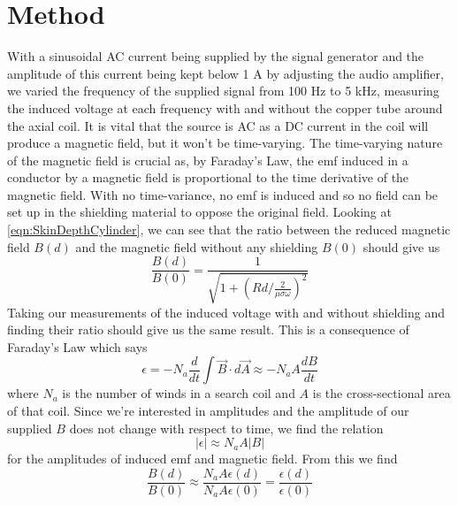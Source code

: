 \documentclass[12pt]{article}
\numberwithin{equation}{section}
\numberwithin{figure}{section}
\begin{document}
    \section{Method}\label{sec:Method}
    With a sinusoidal AC current being supplied by the signal generator and the amplitude of this 
    current being kept below 1 A by adjusting the audio amplifier, we varied the frequency 
    of the supplied signal from 100 Hz to 5 kHz, measuring the induced voltage at each frequency 
    with and without the copper tube around the axial coil. It is vital that the source is AC 
    as a DC current in the coil will produce a magnetic field, but it won't be time-varying. The 
    time-varying nature of the magnetic field is crucial as, by Faraday's Law, the emf induced 
    in a conductor by a magnetic field is proportional to the time derivative of the magnetic 
    field. With no time-variance, no emf is induced and so no field can be set up in the shielding 
    material to oppose the original field. Looking at \autoref{eqn:SkinDepthCylinder}, 
    we can see that the ratio between the reduced magnetic field $B(d)$ and the magnetic field 
    without any shielding $B(0)$ should give us
    \begin{equation}
        \frac{B(d)}{B(0)}=\frac{1}{\sqrt{1+(Rd/\frac{2}{\mu\sigma\omega})^2}}
        \label{eqn:TheoreticalModel}
    \end{equation}
    Taking our measurements of the induced voltage with and without shielding and finding their 
    ratio should give us the same result. This is a consequence of Faraday's Law which says 
    \begin{equation}
        \epsilon = -N_a \frac{d}{dt}\int \vec{B}\cdot d\vec{A}\approx-N_a A \frac{dB}{dt}
        \label{eqn:FaradaysLaw}
    \end{equation}
    where $N_a$ is the number of winds in a search coil and $A$ is the cross-sectional area of 
    that coil. Since we're interested in amplitudes and the amplitude of our supplied $B$ does 
    not change with respect to time, we find the relation 
    \begin{equation}
        |\epsilon|\approx N_a A |B|
        \label{eqn:emfToB}
    \end{equation}
    for the amplitudes of induced emf and magnetic field. From this we find 
    \begin{equation*}
        \frac{B(d)}{B(0)}\approx \frac{N_a A \epsilon(d)}{N_a A \epsilon(0)}=\frac{\epsilon(d)}{\epsilon(0)}
    \end{equation*}
\end{document}

